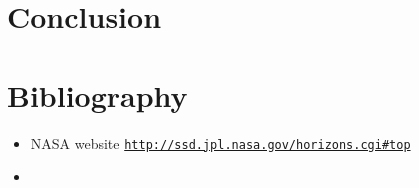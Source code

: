 \documentclass[a4paper, twoside, 11pt]{report}
\theoremstyle{theorem}
\theoremstyle{remark}
\theoremstyle{exemple}
\begin{document}
        \section{}
            \paragraph{}
    
    

\chapter*{Conclusion}

    \paragraph{}
    
    
    
    
\chapter*{Bibliography}
    \begin{itemize}
        \item NASA website \href{{http://ssd.jpl.nasa.gov/horizons.cgi#top}}{\nolinkurl{http://ssd.jpl.nasa.gov/horizons.cgi\#top}}
        \item 
    \end{itemize}
    
    
    
    
    
    
    
    
    
    
\end{document}
